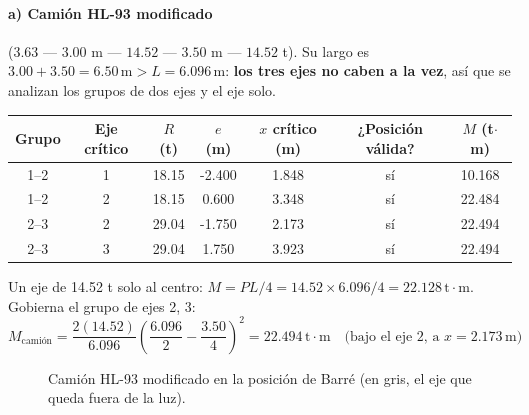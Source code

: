 \documentclass[11pt,a4paper]{article}
\newcommand{\uTm}{\,\mathrm{t{\cdot}m}}
\newcommand{\uM}{\,\mathrm{m}}
\newcommand{\vigaSA}[1]{%
  \draw[line width=1.8pt] (0,0) -- (#1,0);
  \draw[fill=white] (0,0) -- (-0.20,-0.36) -- (0.20,-0.36) -- cycle;
  \fill[pattern=north east lines] (-0.30,-0.36) rectangle (0.30,-0.48);
  \draw[fill=white] (#1,0) -- ({#1-0.20},-0.36) -- ({#1+0.20},-0.36) -- cycle;
  \draw ({#1-0.30},-0.44) -- ({#1+0.30},-0.44);
  \node[font=\scriptsize] at (0,-0.68) {A};
  \node[font=\scriptsize] at (#1,-0.68) {B};
}
\begin{document}
\paragraph{a) Camión HL-93 modificado} ($3.63$ --- $3.00$ m --- $14.52$ --- $3.50$ m --- $14.52$ t).
Su largo es $3.00 + 3.50 = 6.50\uM > L = 6.096\uM$: \textbf{los tres ejes no caben a la vez},
así que se analizan los grupos de dos ejes y el eje solo.

\begin{center}\small
\begin{tabular}{ccccccc}
\toprule
Grupo & Eje crítico & $R$ (t) & $e$ (m) & $x$ crítico (m) & ¿Posición válida? & $M$ (t$\cdot$m)\\
\midrule
1--2 & 1 & 18.15 & -2.400 & 1.848 & \textcolor{ok}{sí} & 10.168 \\
1--2 & 2 & 18.15 & 0.600 & 3.348 & \textcolor{ok}{sí} & 22.484 \\
2--3 & 2 & 29.04 & -1.750 & 2.173 & \textcolor{ok}{sí} & 22.494 \\
2--3 & 3 & 29.04 & 1.750 & 3.923 & \textcolor{ok}{sí} & 22.494 \\
\bottomrule
\end{tabular}
\end{center}
Un eje de 14.52 t solo al centro: $M = PL/4 = 14.52\times6.096/4 = 22.128\uTm$. Gobierna el grupo de ejes
2, 3:
\begin{equation*}
M_{\text{camión}} = \frac{2(14.52)}{6.096}\left(\frac{6.096}{2} - \frac{3.50}{4}\right)^{2}
 = 22.494\uTm \quad\text{(bajo el eje 2, a } x = 2.173\uM\text{)}
\end{equation*}

\begin{figure}[H]
\centering
{}
\caption{Camión HL-93 modificado en la posición de Barré (en gris, el eje que queda fuera de la luz).}
\end{figure}
\end{document}
